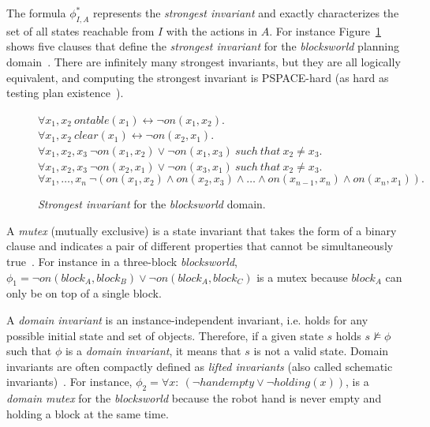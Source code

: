 \documentclass{article}
\begin{document}
The formula $\phi_{I,A}^*$ represents the {\em strongest invariant} and exactly characterizes the set of all states reachable from $I$ with the actions in $A$. For instance Figure~\ref{fig:strongest-invariant} shows five clauses that define the {\em strongest invariant} for the {\em blocksworld} planning domain~\cite{slaney2001blocks}. There are infinitely many strongest invariants, but they are all logically equivalent, and computing the strongest invariant is PSPACE-hard (as hard as testing plan existence~\cite{bylander:complexity:AIJ1994}).

\begin{figure}[hbt!]
  \begin{footnotesize}
$\forall x_1,x_2\ ontable(x_1)\leftrightarrow\neg on(x_1,x_2)$.\\
$\forall x_1,x_2\ clear(x_1)\leftrightarrow\neg on(x_2,x_1)$.\\
$\forall x_1,x_2,x_3\ \neg on(x_1,x_2)\vee\neg on(x_1,x_3)\ such\ that\ x_2\neq x_3$.\\
$\forall x_1,x_2,x_3\ \neg on(x_2,x_1)\vee\neg on(x_3,x_1)\ such\ that\ x_2\neq x_3$.\\
$\forall x_1,\ldots,x_n\ \neg(on(x_1,x_2)\wedge on(x_2,x_3)\wedge\ldots\wedge on(x_{n-1},x_n)\wedge on(x_n,x_1)).$
\end{footnotesize}
 \caption{\small {\em Strongest invariant} for the {\em blocksworld} domain.}
\label{fig:strongest-invariant}
\end{figure}

A {\em mutex} (mutually exclusive) is a state invariant that takes the form of a binary clause and indicates a pair of different properties that cannot be simultaneously true~\cite{kautz:mutex:IJCAI1999}. For instance in a three-block {\em blocksworld}, $\phi_1=\neg on(block_A,block_B)\vee \neg on(block_A,block_C)$ is a mutex because $block_A$ can only be on top of a single block.

A {\em domain invariant} is an instance-independent invariant, i.e. holds for any possible initial state and set of objects. Therefore, if a given state $s$ holds $s\nvDash \phi$ such that $\phi$ is a {\em domain invariant}, it means that $s$ is not a valid state. Domain invariants are often compactly defined as {\em lifted invariants} (also called schematic invariants)~\cite{rintanen:schematicInvariants:AAAI2017}. For instance, $\phi_2=\forall x:\ (\neg handempty\vee \neg holding(x))$, is a {\em domain mutex} for the {\em blocksworld} because the robot hand is never empty and holding a block at the same time.
\end{document}
